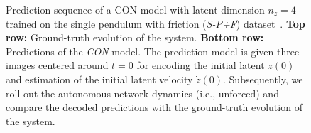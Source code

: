 \begin{figure}[hb]
    \caption{Prediction sequence of a \gls{CON} model with latent dimension $n_z=4$ trained on the single pendulum with friction (\emph{S-P+F}) dataset~\cite{botev2021priors}. 
    \textbf{Top row:} Ground-truth evolution of the system. \textbf{Bottom row:} Predictions of the \emph{CON} model. \newline
    The prediction model is given three images centered around $t=0$ for encoding the initial latent $z(0)$ and estimation of the initial latent velocity $\dot{z}(0)$. Subsequently, we roll out the autonomous network dynamics (i.e., unforced) and compare the decoded predictions with the ground-truth evolution of the system.  
    }\label{fig:apx-con:latent_dynamics:sequence_of_stills:s-p+f:rollout6}
\end{figure}


